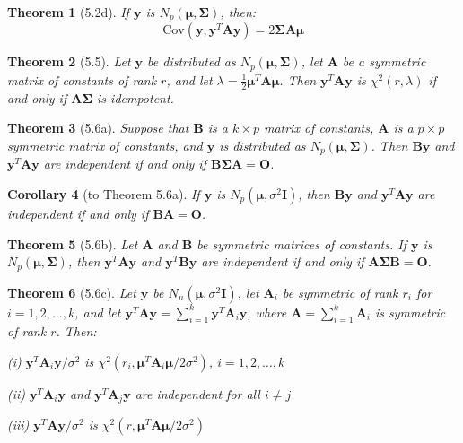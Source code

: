 \documentclass{article}
\newtheorem{theorem}{Theorem}[section]
\newtheorem{corollary}[theorem]{Corollary}
\begin{document}
\begin{theorem}[5.2d]
If $\mathbf{y}$ is $N_p(\boldsymbol{\mu}, \boldsymbol{\Sigma})$, then:
\[\text{Cov}(\mathbf{y}, \mathbf{y}^T\mathbf{A}\mathbf{y}) = 2\boldsymbol{\Sigma}\mathbf{A}\boldsymbol{\mu}\]
\end{theorem}

\begin{theorem}[5.5]
Let $\mathbf{y}$ be distributed as $N_p(\boldsymbol{\mu}, \boldsymbol{\Sigma})$, let $\mathbf{A}$ be a symmetric matrix of constants of rank $r$, and let $\lambda = \frac{1}{2}\boldsymbol{\mu}^T \mathbf{A} \boldsymbol{\mu}$. Then $\mathbf{y}^T\mathbf{A}\mathbf{y}$ is $\chi^2(r, \lambda)$ if and only if $\mathbf{A}\boldsymbol{\Sigma}$ is idempotent.
\end{theorem}

\begin{theorem}[5.6a]
Suppose that $\mathbf{B}$ is a $k \times p$ matrix of constants, $\mathbf{A}$ is a $p \times p$ symmetric matrix of constants, and $\mathbf{y}$ is distributed as $N_p(\boldsymbol{\mu},\boldsymbol{\Sigma})$. Then $\mathbf{B}\mathbf{y}$ and $\mathbf{y}^T\mathbf{A}\mathbf{y}$ are independent if and only if $\mathbf{B}\boldsymbol{\Sigma}\mathbf{A} = \mathbf{O}$.
\end{theorem}

\begin{corollary}[to Theorem 5.6a]
If $\mathbf{y}$ is $N_p(\boldsymbol{\mu},\sigma^2\mathbf{I})$, then $\mathbf{B}\mathbf{y}$ and $\mathbf{y}^T\mathbf{A}\mathbf{y}$ are independent if and only if $\mathbf{B}\mathbf{A} = \mathbf{O}$.
\end{corollary}

\begin{theorem}[5.6b]
Let $\mathbf{A}$ and $\mathbf{B}$ be symmetric matrices of constants. If $\mathbf{y}$ is $N_p(\boldsymbol{\mu}, \boldsymbol{\Sigma})$, then $\mathbf{y}^T\mathbf{A}\mathbf{y}$ and $\mathbf{y}^T\mathbf{B}\mathbf{y}$ are independent if and only if $\mathbf{A}\boldsymbol{\Sigma}\mathbf{B} = \mathbf{O}$.
\end{theorem}

\begin{theorem}[5.6c]
Let $\mathbf{y}$ be $N_n(\boldsymbol{\mu},\sigma^2\mathbf{I})$, let $\mathbf{A}_i$ be symmetric of rank $r_i$ for $i = 1,2,\ldots,k$, and let $\mathbf{y}^T\mathbf{A}\mathbf{y} = \sum_{i=1}^k \mathbf{y}^T\mathbf{A}_i\mathbf{y}$, where $\mathbf{A} = \sum_{i=1}^k \mathbf{A}_i$ is symmetric of rank $r$. Then:

(i) $\mathbf{y}^T\mathbf{A}_i\mathbf{y}/\sigma^2$ is $\chi^2(r_i,\boldsymbol{\mu}^T\mathbf{A}_i\boldsymbol{\mu}/2\sigma^2)$, $i = 1,2,\ldots,k$

(ii) $\mathbf{y}^T\mathbf{A}_i\mathbf{y}$ and $\mathbf{y}^T\mathbf{A}_j\mathbf{y}$ are independent for all $i \neq j$

(iii) $\mathbf{y}^T\mathbf{A}\mathbf{y}/\sigma^2$ is $\chi^2(r,\boldsymbol{\mu}^T\mathbf{A}\boldsymbol{\mu}/2\sigma^2)$
\end{theorem}
\end{document}
